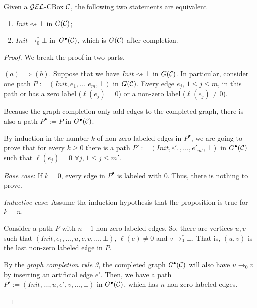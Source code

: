 \begin{lemma}
\label{lemma-equiv}
Given a $\mathcal{GEL}$-CBox $\mathcal{C}$, the following two statements are equivalent
\begin{enumerate}[label=(\alph*)]
    \item $Init \rightsquigarrow \bot$ in $G(\mathcal{C})$;
    \item $Init \to_0^* \bot$ in~$G^\bullet(\mathcal{C})$, which is $G(\mathcal{C})$ after completion.
\end{enumerate}
\end{lemma}

\begin{proof}
We break the proof in two parts.
\begin{description}
    \item $(a) \implies (b)$. Suppose that we have $Init \rightsquigarrow \bot$ in $G(\mathcal{C})$. In particular, consider one path $P := (Init, e_1, \dots, e_m, \bot)$ in $G(\mathcal{C})$. Every edge $e_j$, $1 \leq j \leq m$, in this path or has a zero label ($\ell(e_j) = 0$) or a non-zero label ($\ell(e_j) \neq 0$).
    
    Because the graph completion only add edges to the completed graph, there is also a path $P^\bullet := P$ in $G^\bullet(\mathcal{C})$.
    
    By induction in the number $k$ of non-zero labeled edges in $P^\bullet$, we are going to prove that for every $k \geq 0$ there is a path $P' := (Init, e'_1, \dots, e'_{m'}, \bot)$ in $G^\bullet(\mathcal{C})$ such that $\ell(e_j) = 0$ $\forall j$, $1 \leq j \leq m'$.
    
    \begin{description}
        \item \emph{Base case}: If $k = 0$, every edge in $P^\bullet$ is labeled with 0. Thus, there is nothing to prove.
        
        \item \emph{Inductive case}: Assume the induction hypothesis that the proposition is true for $k = n$. 
        
        Consider a path $P$ with $n + 1$ non-zero labeled edges. So, there are vertices $u, v$ such that $(Init, e_1, \dots, u,  e, v, \dots, \bot)$, $\ell(e) \neq 0$ and $v \to_0^* \bot$. That is, $(u, v)$ is the last non-zero labeled edge in $P$.
        
        By the \emph{graph completion rule 3}, the completed graph $G^\bullet(\mathcal{C})$ will also have $u \to_0 v$ by inserting an artificial edge $e'$. Then, we have a path $P' := (Init, \dots, u, e', v, \dots, \bot)$ in $G^\bullet(\mathcal{C})$, which has $n$ non-zero labeled edges. 
        

\end{description}
\end{description}
\end{proof}
